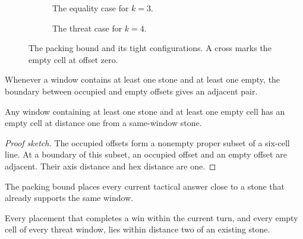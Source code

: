 \begin{figure}[tbp]
  \centering
  \begin{subfigure}[t]{.47\textwidth}
    \centering
    \caption{The equality case for $k=3$.}
  \end{subfigure}
  \hfill
  \begin{subfigure}[t]{.47\textwidth}
    \centering
    \caption{The threat case for $k=4$.}
  \end{subfigure}
  \caption{The packing bound and its tight configurations.  A cross marks the
  empty cell at offset zero.}
  \label{fig:packing}
\end{figure}

Whenever a window contains at least one stone and at least one empty, the
boundary between occupied and empty offsets gives an adjacent pair.

\begin{lemma}
\label{lem:L2}
Any window containing at least one stone and at least one empty cell has an
empty cell at distance one from a same-window stone.
\end{lemma}

\begin{proof}[Proof sketch]
The occupied offsets form a nonempty proper subset of a six-cell line.  At a
boundary of this subset, an occupied offset and an empty offset are adjacent.
Their axis distance and hex distance are one.
\end{proof}

The packing bound places every current tactical answer close to a stone that
already supports the same window.

\begin{theorem}
\label{thm:T1}
Every placement that completes a win within the current turn, and every empty
cell of every threat window, lies within distance two of an existing stone.
\end{theorem}

